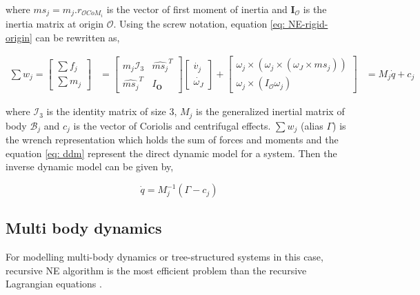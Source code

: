 where $ms_j = m_j.r_{\mathcal{O}CoM_i}$ is the vector of first moment of inertia and $\mathbf{I}_{\mathcal{O}}$ is the inertia matrix at origin $\mathcal{O}$.
Using the screw notation, equation \ref{eq: NE-rigid-origin} can be rewritten as,


\begin{align}
    \sum w_j = \begin{bmatrix}
        \sum f_j \\
        \sum m_j
    \end{bmatrix} &= 
    \begin{bmatrix}
        m_j\mathcal{I}_3 & \hat{ms_j}^T \\
        \hat{ms_j}^T & I_{\mathbf{O}}
    \end{bmatrix}
    \begin{bmatrix}
        \dot{v_j} \\
        \dot{\omega_J}
    \end{bmatrix} +
    \begin{bmatrix}
        \omega_j \times (\omega_j \times (\omega_J \times ms_j)) \\
        \omega_j \times (I_{\mathcal{O}}\omega_j)
    \end{bmatrix} &= M_j\dot{q} + c_j
    \label{eq: ddm}
\end{align}

where $\mathcal{I}_3$ is the identity matrix of size $3$, $M_j$ is the generalized inertial matrix of body $\mathcal{B}_j$ and $c_j$ is the vector of Coriolis and centrifugal effects.
$\sum w_j$ (alias $\varGamma$) is the wrench representation which holds the sum of forces and moments and the equation \ref{eq: ddm} represent the direct dynamic model for a system.
Then the inverse dynamic model can be given by,

\begin{equation}
    \dot{q} = M_j^{-1}(\varGamma - c_j)
\end{equation}

\subsection{Multi body dynamics}

For modelling multi-body dynamics or tree-structured systems in this case, recursive NE algorithm is the most efficient problem than the recursive Lagrangian equations \cite{khalilunified}.

